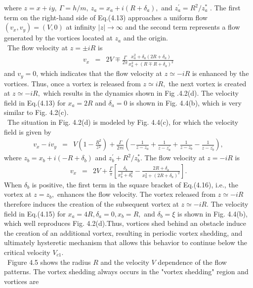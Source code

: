 \documentclass[12pt,a4paper]{report}
\begin{document}
where $z = x + iy, \ \Gamma = h/m, \ z_a = x_a + i(R + \delta_a),$
and $z^\prime_a = R^2/z^*_a$ \cite{56}.
The first term on the right-hand side of Eq.(4.13)
approaches a uniform flow $(v_x, v_y)=(V,0)$ at 
infinity $|z| \rightarrow \infty$ and the second term 
represents a flow generated by the vortices located at
$z_a$ and the origin.
\\
\ The flow velocity at $z = \pm iR$ is
\begin{eqnarray}
v_x & = & 2V \mp \frac{\Gamma}{2 \pi}
\frac{x^2_a + \delta_a(2R+\delta_a)}{x^2_a + (R \mp R + \delta_a)^2}
\end{eqnarray}
and $v_y = 0$, which indicates that the flow velocity at
$z \simeq -iR$ is enhanced by the vortices. Thus, once a vortex
is released from $z \simeq iR,$ the next vortex is created at
$z \simeq -iR,$ which results in the dynamics shown in Fig .4.2(d).
The velocity field in Eq.(4.13) for $x_a = 2R$ and $\delta_a = 0$ is
shown in Fig. 4.4(b), which is very similar to Fig. 4.2(c).
\\
\ The situation in Fig. 4.2(d) is modeled by Fig. 4.4(c), for
which the velocity field is given by
\begin{eqnarray}
v_x - iv_y & = & V \left( 1 - \frac{R^2}{z^2} \right)
+ \frac{\Gamma}{2 \pi i} \left( - \frac{1}{z-z_a} + \frac{1}{z-z^\prime_a}
+ \frac{1}{z-z_b} - \frac{1}{z-z^\prime_b} \right),
\end{eqnarray}
where $z_b = x_b + i(-R+\delta_b)$ and $z^\prime_b + R^2/z^*_b$. The flow
velocity at $z=-iR$ is
\begin{eqnarray}
v_x & = & 2V + \frac{\Gamma}{\pi}
\left[
\frac{\delta_b}{x^2_b+\delta^2_b} - \frac{2R+\delta_a}{x^2_a+(2R+\delta_a)^2}
\right].
\end{eqnarray}
When $\delta_b$ is positive, the first term in the square bracket
of Eq.(4.16), i.e., the vortex at $z=z_b,$ enhances the flow
velocity. The vortex released from $z \simeq -iR$ therefore induces
the creation of the subsequent vortex at $z \simeq -iR$.
The velocity field in Eq.(4.15) for $x_a=4R,\delta_a=0,x_b=R,$
and $\delta_b=\xi$ is shown in Fig. 4.4(b), which well reproduces
Fig. 4.2(d).Thus, vortices shed behind an obstacle induce
the creation of an additional vortex, resulting in periodic
vortex shedding, and ultimately hysteretic mechanism
that allows this behavior to continue below the critical velocity $V_{c1}$.
\\
\ Figure 4.5 shows the radius $R$ and the velocity $V$ dependence
of the flow patterns. The vortex shedding always
occurs in the "vortex shedding" region and vortices are
\end{document}
